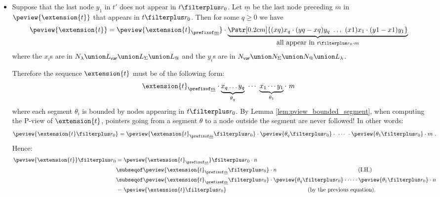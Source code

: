\begin{itemize}
\begin{itemize}
        \item Suppose that the last node $y_1$ in $t'$ does not appear in $t\filterplus r_0$.
        Let $\underline{m}$ be the last node preceding $m$ in $\peview{\extension{t}}$ that appears in $t\filterplus r_0$. Then for some $q\geq 0$ we have
        \begin{equation*}
        \peview{\extension{t}} = \peview{\extension{t}_{\prefixof \underline{m}}} \cdot \underbrace{\Pstr[0.2cm]{(xq){x_q} \cdot (yq-xq){y_q}\ \ldots\ (x1){x_1} \cdot (y1-x1){y_1}}}_{\mbox{all appear in } t\filterplus r_0 \cdot m}
        \end{equation*}
        where the $x_i$s are in $ N_\lambda \union L_{\sf var} \union  L_\Sigma \union L_@$ and the $y_i$s are in $N_{\sf var} \union N_\Sigma \union N_@ \union L_\lambda$.

        Therefore the sequence $\extension{t}$ must be of the following form:
        $$\extension{t}_{\prefixof \underline{m}} \cdot \underbrace{x_q \ldots y_q}_{\theta_q} \ \cdots \ \underbrace{x_1 \cdots y_1}_{\theta_1} \cdot\ m $$
        where each segment $\theta_i$ is bounded by nodes appearing in $t\filterplus r_0$.
        By Lemma \ref{lem:pview_bounded_segment}, when computing the P-view of $\extension{t}$, pointers going from a segment $\theta$ to a node outside the segment are never followed! In other words:
        $$ \peview{\extension{t} \filterplus r_0} =
        \peview{\extension{t}_{\prefixof \underline{m}} \filterplus r_0} \cdot \peview{\theta_q \filterplus r_0} \cdot\ \cdots\
        \cdot \peview{\theta_1 \filterplus r_0} \cdot m \ .$$
        Hence:
            \begin{align*}
            \peview{\extension{t}} \filterplus r_0
            &= \peview{\extension{t}_{\prefixof \underline{m}}} \filterplus r_0 \cdot n \\
            &\subseqof \peview{\extension{t}_{\prefixof \underline{m}} \filterplus r_0}  \cdot n
                    \hspace{5cm} \mbox{(I.H.)} \\
            &\subseqof \peview{\extension{t}_{\prefixof \underline{m}} \filterplus r_0} \cdot \peview{\theta_q \filterplus r_0} \cdot \cdots \cdot \peview{\theta_1 \filterplus r_0}  \cdot n \\
            &= \peview{\extension{t} \filterplus r_0} \hspace{5cm}
                    \mbox{(by the previous equation).}
          \end{align*}
    \end{itemize}


\end{itemize}
